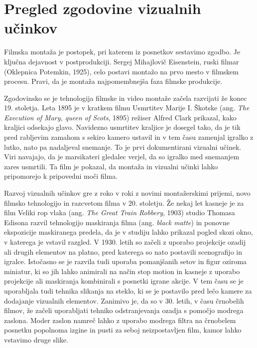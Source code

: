 \documentclass[a4paper, 12pt]{book}
\begin{document}
\section{Pregled zgodovine vizualnih učinkov}

Filmska montaža je postopek, pri katerem iz posnetkov sestavimo zgodbo. 
Je ključna dejavnost v postprodukciji. 
Sergej Mihajlovič Eisenstein, ruski filmar (Oklepnica Potemkin, 1925), celo postavi montažo na prvo mesto v filmskem procesu.
Pravi, da je montaža najpomembnejša faza filmske produkcije. %

Zgodovinsko se je tehnologija filmske in video montaže začela razvijati že konec 19. stoletja. 
Leta 1895 je v kratkem filmu Usmrtitev Marije I. Škotske (ang. {\it The Execution of Mary, queen of Scots}, 1895) režiser Alfred Clark prikazal, kako kraljici odsekajo glavo. 
Navidezno usmrtitev kraljice je dosegel tako, da je tik pred rabljevim zamahom s sekiro kamero ustavil in v tem času zamenjal igralko z lutko, nato pa nadaljeval snemanje. 
To je prvi dokumentirani vizualni učinek. 
Viri navajajo, da je marsikateri gledalec verjel, da so igralko med snemanjem zares usmrtili. %
Ta film je pokazal, da montaža in vizualni učinki lahko pripomorejo k pripovedni moči filma.

Razvoj vizualnih učinkov gre z roko v roki z novimi montažerskimi prijemi, novo filmsko tehnologijo in razcvetom filma v 20. stoletju. 
Že nekaj let kasneje je za film Veliki rop vlaka (ang. {\it The Great Train Robbery}, 1903) studio Thomasa Edisona razvil tehnologijo maskiranja filma (ang. {\it black matte}) in ponovne ekspozicije maskiranega predela, da je v studiju lahko prikazal pogled skozi okno, v katerega je vstavil razgled. 
V 1930. letih so začeli z uporabo projekcije ozadij ali drugih elementov na platno, pred katerega so nato postavili scenografijo in igralce. 
Istočasno se je razvila tudi uporaba pomanjšanih setov in figur oziroma miniatur, ki so jih lahko animirali na način stop motion in kasneje z uporabo projekcije ali maskiranja kombinirali s posnetki igrane akcije. %
V tem času se je uporabljala tudi tehnika slikanja na steklo, ki se je postavilo pred lečo kamere za dodajanje vizualnih elementov. 
Zanimivo je, da so v 30. letih, v času črnobelih filmov, že začeli uporabljati tehniko odstranjevanja ozadja s pomočjo modrega zaslona. 
Moder zaslon namreč lahko z uporabo modrega filtra na črnobelem posnetku popolnoma izgine in pusti za seboj neizpostavljen film, kamor lahko vstavimo druge slike. 
\end{document}
